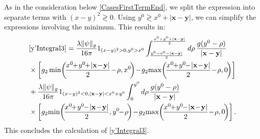 \documentclass[b5paper,draft,openbib,12pt]{memoir}
\newcommand{\vx}{\mathbf{x}}
\newcommand{\vy}{\mathbf{y}}
\begin{document}
As in the consideration below 
\eqref{CasesFirstTermEnd}, we split the expression 
into separate terms with \((x-y)^2 \gtrless 0\). 
Using \(y^0\gtrless x^0+|\vx-\vy|\), we can simplify 
the expressions involving the minimum. This results 
in:
\begin{align}
    &\eqref{y'Integral3} =
    \frac{\lambda\|\psi\|_g}{16\pi} 1_{(x-y)^2>0,y^0>x^0}
    \int_{\frac{y^0-x^0-|\vx-\vy|}{2}}^{\frac{x^0+y^0+|\vx-\vy|}{2}}d\rho \, \frac{g(y^0-\rho)}{|\vx-\vy|}\nonumber\\
    &\times \left[g_2 \min\!\left(\!\frac{x^0\!\!+\!y^0\!\!+\!|\vx\!-\!\vy|}{2}\!-\!\rho,x^0\!\right) \!-\!g_2\!\max\!\left(\! \frac{x^0\!\!+\!y^0\!\!-\!|\vx\!-\!\vy|}{2}\!-\!\rho,0\!\right) \right]\nonumber\\
    &+\frac{\lambda\|\psi\|_g}{16\pi} 
    1_{(x-y)^2<0,|\vx-\vy|<x^0+y^0}
    \int_{0}^{y^0}d\rho \, \frac{g(y^0-\rho)}{|\vx-\vy|}\label{eq:resulty'Integral3}\\
    &\times \left[g_2\!\min\!\left(\!\frac{x^0\!\!+\!y^0\!\!-\!|\vx\!-\!\vy|}{2},y^0\!\!-\!\rho\!\right) \!-\!g_2\!\max\!\left( \!\frac{x^0\!\!+\!y^0\!\!-\!|\vx\!-\!\vy|}{2}\!-\!\rho,0\!\right) \right].\notag
\end{align}
This concludes the calculation of \eqref{y'Integral3}.
\end{document}

